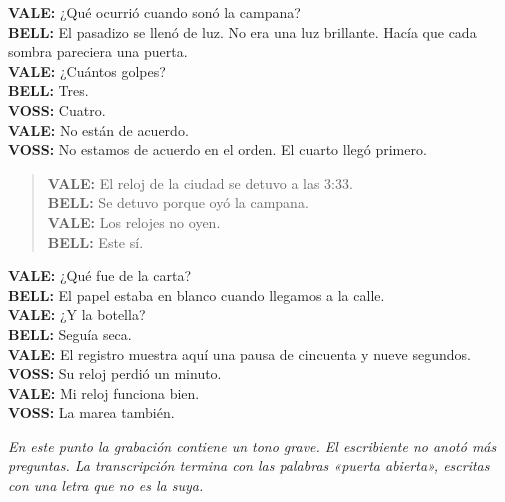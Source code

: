 \noindent\textbf{VALE:} ¿Qué ocurrió cuando sonó la campana?\\
\textbf{BELL:} El pasadizo se llenó de luz. No era una luz brillante. Hacía
que cada sombra pareciera una puerta.\\
\textbf{VALE:} ¿Cuántos golpes?\\
\textbf{BELL:} Tres.\\
\textbf{VOSS:} Cuatro.\\
\textbf{VALE:} No están de acuerdo.\\
\textbf{VOSS:} No estamos de acuerdo en el orden. El cuarto llegó primero.

\begin{quote}
\textbf{VALE:} El reloj de la ciudad se detuvo a las 3:33.\\
\textbf{BELL:} Se detuvo porque oyó la campana.\\
\textbf{VALE:} Los relojes no oyen.\\
\textbf{BELL:} Este sí.
\end{quote}

\textbf{VALE:} ¿Qué fue de la carta?\\
\textbf{BELL:} El papel estaba en blanco cuando llegamos a la calle.\\
\textbf{VALE:} ¿Y la botella?\\
\textbf{BELL:} Seguía seca.\\
\textbf{VALE:} El registro muestra aquí una pausa de cincuenta y nueve
segundos.\\
\textbf{VOSS:} Su reloj perdió un minuto.\\
\textbf{VALE:} Mi reloj funciona bien.\\
\textbf{VOSS:} La marea también.

\medskip
\noindent\textit{En este punto la grabación contiene un tono grave. El
escribiente no anotó más preguntas. La transcripción termina con las palabras
«puerta abierta», escritas con una letra que no es la suya.}
